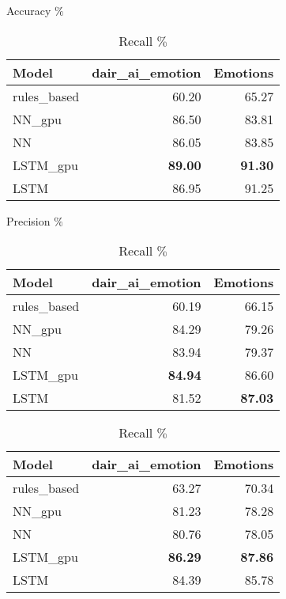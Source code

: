 \begin{table}[!ht]
    \centering
    \begin{minipage}{0.45\textwidth}
        \centering
        \small
        \caption{Accuracy \(\%\)}
        \begin{tabular}{lrr}
            \toprule
            Model        & dair\_ai\_emotion & Emotions       \\
            \midrule
            rules\_based & 60.20             & 65.27          \\
            NN\_gpu      & 86.50             & 83.81          \\
            NN           & 86.05             & 83.85          \\
            LSTM\_gpu    & \textbf{89.00}    & \textbf{91.30} \\
            LSTM         & 86.95             & 91.25          \\
            \bottomrule
        \end{tabular}
    \end{minipage}
    \hfill
    \begin{minipage}{0.45\textwidth}
        \centering
        \small
        \caption{Precision \(\%\)}
        \begin{tabular}{lrr}
            \toprule
            Model        & dair\_ai\_emotion & Emotions       \\
            \midrule
            rules\_based & 60.19             & 66.15          \\
            NN\_gpu      & 84.29             & 79.26          \\
            NN           & 83.94             & 79.37          \\
            LSTM\_gpu    & \textbf{84.94}    & 86.60          \\
            LSTM         & 81.52             & \textbf{87.03} \\
            \bottomrule
        \end{tabular}

    \end{minipage}
    \vspace{0.1em}
    \begin{minipage}{0.45\textwidth}
        \centering
        \small
        \caption{Recall \(\%\)}
        \begin{tabular}{lrr}
            \toprule
            Model        & dair\_ai\_emotion & Emotions       \\
            \midrule
            rules\_based & 63.27             & 70.34          \\
            NN\_gpu      & 81.23             & 78.28          \\
            NN           & 80.76             & 78.05          \\
            LSTM\_gpu    & \textbf{86.29}    & \textbf{87.86} \\
            LSTM         & 84.39             & 85.78          \\
            \bottomrule
        \end{tabular}


\end{minipage}
\end{table}

